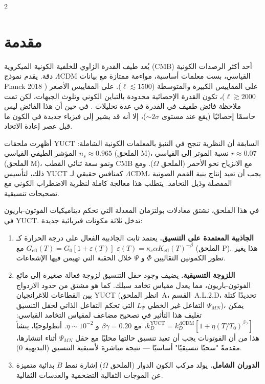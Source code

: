 \documentclass[11pt,a4paper]{article}
\begin{document}
	\vspace{0.4cm}
	
	\begin{multicols}{2}
		
		\section{مقدمة}
		
		يُعد طيف القدرة الزاوي للخلفية الكونية الميكروية (CMB) أحد أكثر الرصدات الكونية دقة. يقدم نموذج $\Lambda$CDM القياسي، بست معلمات أساسية، مواءمة ممتازة مع بيانات Planck 2018 على المقاييس الكبيرة والمتوسطة ($\ell \lesssim 1500$). على المقاييس الأصغر ($\ell \gtrsim 2000$)، تكون القدرة الإحصائية محدودة بالتباين الكوني وتلوث الجبهات، لكن تمت ملاحظة فائض طفيف في القدرة في عدة تحليلات \cite{Planck2018}. في حين أن هذا الفائض ليس حاسمًا إحصائيًا (يقع عند مستوى $\sim2\sigma$)، إلا أنه قد يشير إلى فيزياء جديدة في الكون ما قبل عصر إعادة الاتحاد.
		
		أظهرت ملحقات YUCT السابقة أن النظرية تنجح في التنبؤ بالمعلمات الكونية الشاملة: المؤشر الطيفي القياسي $n_s \approx 0.965$ (الملحق M)، نسبة الموتر إلى القياسي $r \approx 0.07$ (الملحق M)، ونمو سعة ثنائي القطب CMB مع الانزياح نحو الأحمر (الملحق $\Omega$). ومع ذلك، لتأسيس YUCT كمنافس حقيقي لـ $\Lambda$CDM، يجب أن تعيد إنتاج بنية القمم الصوتية المفصلة وذيل التخامد. يتطلب هذا معالجة كاملة لنظرية الاضطراب الكوني مع تصحيحات تنسيقية.
		
		في هذا الملحق، نشتق معادلات بولتزمان المعدلة التي تحكم ديناميكيات الفوتون-باريون في YUCT. تدخل ثلاثة مكونات فيزيائية جديدة:
		\begin{enumerate}
			\item \textbf{الجاذبية المعتمدة على التنسيق.} يعتمد ثابت الجاذبية الفعال على درجة الحرارة كـ $G_{\mathrm{eff}}(T) = G_0[1 + \varepsilon(T)]$ مع $\varepsilon(T) = \kappa_c \alpha K_{\mathrm{eff}}(T)^{-\beta}$ (الملحق P). هذا يغير تطور الكمونين الثقاليين $\Phi$ و $\Psi$ خلال الحقبة التي تهيمن فيها الإشعاعات.
			\item \textbf{اللزوجة التنسيقية.} يضيف وجود حقل التنسيق لزوجة فعالة صغيرة إلى مائع الفوتون-باريون، مما يعدل مقياس تخامد سيلك. كما هو مشتق من حدود الازدواج بين القطاعات للاغرانجيان YUCT (انظر الملحق~A، القسم~A.L.2.D، تحديدًا كتلة التفاعل غير الخطي \(L_{\Psi}\) التي تحكم التفاعل الذاتي لحقل التنسيق \(\Psi_{MN}\))، يمكن تغليف هذا التأثير في تصحيح مضاعف لمقياس التخامد القياسي: $k_D^{\text{YUCT}} = k_D^{\Lambda\text{CDM}} [1 + \eta (T/T_0)^{\beta\gamma}]$، مع $\beta\gamma = 0.20$ و $\eta \sim 10^{-2}$. أنطولوجيًا، ينشأ هذا من أن الفوتونات يجب أن تعيد تنسيق حالتها محليًا مع حقل $\Psi_{MN}$ أثناء انتشارها، مقدمةً "سحبًا تنسيقيًا" أساسيًا — نتيجة مباشرة لأسبقية التنسيق (البديهية 0).
			\item \textbf{الدوران الشامل.} يولد مركب الكون الدوار (الملحق $\Omega$) إشارة نمط $B$ بدائية متميزة عن الموجات الثقالية التضخمية والعدسات الثقالية.
		\end{enumerate}
		

\end{multicols}
\end{document}
